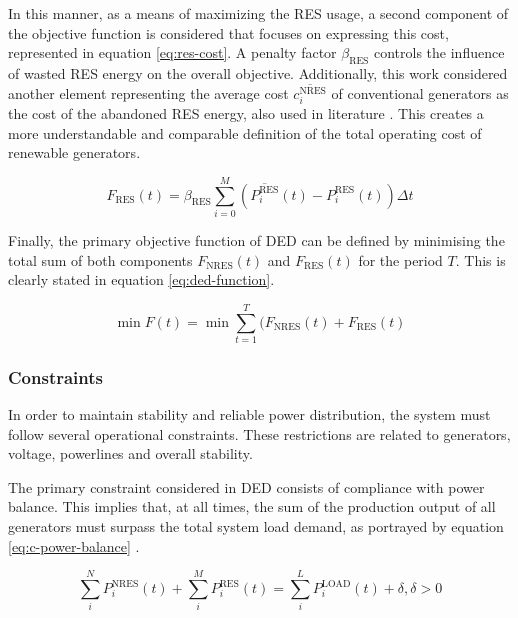 In this manner, as a means of maximizing the \ac{RES} usage, a second component of the objective function is considered that focuses on expressing this cost, represented in equation \ref{eq:res-cost}. A penalty factor $\beta_\text{RES}$ controls the influence of wasted \ac{RES} energy on the overall objective. Additionally, this work considered another element representing the average cost $\overline{c^\text{NRES}_i}$ of conventional generators as the cost of the abandoned \ac{RES} energy, also used in literature \cite{chenScalableGraphReinforcement2023, liNovelGraphReinforcement2022, liNovelGraphReinforcement2022}. This creates a more understandable and comparable definition of the total operating cost of renewable generators.  \par

\begin{equation} \label{eq:res-cost}
	F_\text{RES}(t) = \beta_\text{RES} \sum^M_{i=0}  (\overline{P^\text{RES}_i}(t) - P^\text{RES}_i(t)) \Delta t 
\end{equation}

Finally, the primary objective function of \ac{DED} can be defined by minimising the total sum of both components $F_\text{NRES}(t)$ and $F_\text{RES}(t)$ for the period $T$. This is clearly stated in equation \ref{eq:ded-function}.

\begin{equation} \label{eq:ded-function}
	\min F (t) =  \min\sum^T_{t=1}(F_\text{NRES}(t) + F_{\text{RES}}(t)
\end{equation}

\subsubsection{Constraints} \label{sec:constraints}

In order to maintain stability and reliable power distribution, the system must follow several operational constraints. These restrictions are related to generators, voltage, powerlines and overall stability.  \par

The primary constraint considered in \ac{DED} consists of compliance with power balance. This implies that, at all times, the sum of the production output of all generators must surpass the total system load demand, as portrayed by equation \ref{eq:c-power-balance} \cite{chenScalableGraphReinforcement2023, liNovelGraphReinforcement2022, leiDynamicEnergyDispatch2021}. 

\begin{equation} \label{eq:c-power-balance}
	\sum^N_i P^\text{NRES}_i(t) + \sum^M_i P^\text{RES}_i(t) = \sum^L_i P^\text{LOAD}_i(t) + \delta, \delta > 0
\end{equation}

